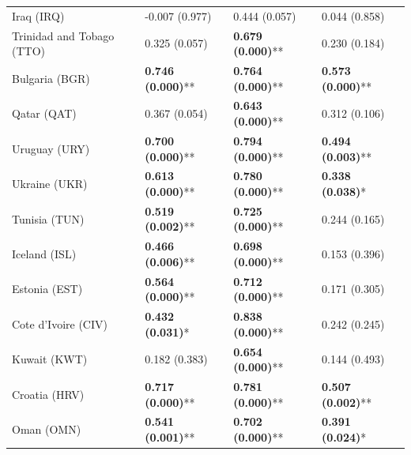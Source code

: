 \begin{longtable}{p{5cm}p{3cm}p{3cm}p{5cm}}
Iraq (IRQ) & \textcolor{atlOrange600}{-0.007 (0.977)} & \textcolor{atlOrange600}{0.444 (0.057)} & \textcolor{atlOrange600}{0.044 (0.858)} \\
Trinidad and Tobago (TTO) & \textcolor{atlOrange600}{0.325 (0.057)} & \textcolor{atlLime600}{\textbf{0.679 (0.000)}**} & \textcolor{atlOrange600}{0.230 (0.184)} \\
Bulgaria (BGR) & \textcolor{atlLime600}{\textbf{0.746 (0.000)}**} & \textcolor{atlLime600}{\textbf{0.764 (0.000)}**} & \textcolor{atlLime600}{\textbf{0.573 (0.000)}**} \\
Qatar (QAT) & \textcolor{atlOrange600}{0.367 (0.054)} & \textcolor{atlLime600}{\textbf{0.643 (0.000)}**} & \textcolor{atlOrange600}{0.312 (0.106)} \\
Uruguay (URY) & \textcolor{atlLime600}{\textbf{0.700 (0.000)}**} & \textcolor{atlLime600}{\textbf{0.794 (0.000)}**} & \textcolor{atlLime600}{\textbf{0.494 (0.003)}**} \\
Ukraine (UKR) & \textcolor{atlLime600}{\textbf{0.613 (0.000)}**} & \textcolor{atlLime600}{\textbf{0.780 (0.000)}**} & \textcolor{atlLime600}{\textbf{0.338 (0.038)}*} \\
Tunisia (TUN) & \textcolor{atlLime600}{\textbf{0.519 (0.002)}**} & \textcolor{atlLime600}{\textbf{0.725 (0.000)}**} & \textcolor{atlOrange600}{0.244 (0.165)} \\
Iceland (ISL) & \textcolor{atlLime600}{\textbf{0.466 (0.006)}**} & \textcolor{atlLime600}{\textbf{0.698 (0.000)}**} & \textcolor{atlOrange600}{0.153 (0.396)} \\
Estonia (EST) & \textcolor{atlLime600}{\textbf{0.564 (0.000)}**} & \textcolor{atlLime600}{\textbf{0.712 (0.000)}**} & \textcolor{atlOrange600}{0.171 (0.305)} \\
Cote d'Ivoire (CIV) & \textcolor{atlLime600}{\textbf{0.432 (0.031)}*} & \textcolor{atlLime600}{\textbf{0.838 (0.000)}**} & \textcolor{atlOrange600}{0.242 (0.245)} \\
Kuwait (KWT) & \textcolor{atlOrange600}{0.182 (0.383)} & \textcolor{atlLime600}{\textbf{0.654 (0.000)}**} & \textcolor{atlOrange600}{0.144 (0.493)} \\
Croatia (HRV) & \textcolor{atlLime600}{\textbf{0.717 (0.000)}**} & \textcolor{atlLime600}{\textbf{0.781 (0.000)}**} & \textcolor{atlLime600}{\textbf{0.507 (0.002)}**} \\
Oman (OMN) & \textcolor{atlLime600}{\textbf{0.541 (0.001)}**} & \textcolor{atlLime600}{\textbf{0.702 (0.000)}**} & \textcolor{atlLime600}{\textbf{0.391 (0.024)}*} \\

\end{longtable}
